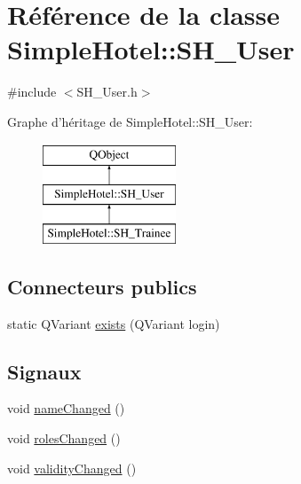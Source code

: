 \hypertarget{classSimpleHotel_1_1SH__User}{\section{Référence de la classe Simple\-Hotel\-:\-:S\-H\-\_\-\-User}
\label{classSimpleHotel_1_1SH__User}
}


{\ttfamily \#include $<$S\-H\-\_\-\-User.\-h$>$}

Graphe d'héritage de Simple\-Hotel\-:\-:S\-H\-\_\-\-User\-:\begin{figure}[H]
\begin{center}
\leavevmode
\includegraphics[height=3.000000cm]{classSimpleHotel_1_1SH__User}
\end{center}
\end{figure}
\subsection*{Connecteurs publics}
\begin{DoxyCompactItemize}
\item 
static Q\-Variant \hyperlink{classSimpleHotel_1_1SH__User_a5b620469cfd767611c8be0cea77842ee}{exists} (Q\-Variant login)
\end{DoxyCompactItemize}
\subsection*{Signaux}
\begin{DoxyCompactItemize}
\item 
void \hyperlink{classSimpleHotel_1_1SH__User_af3b558a0626d2fe726f73b65c27299ce}{name\-Changed} ()
\item 
void \hyperlink{classSimpleHotel_1_1SH__User_a3b8e95cc9b6e660e2b879658f923265a}{roles\-Changed} ()
\item 
void \hyperlink{classSimpleHotel_1_1SH__User_a5355f39889901f52c975292df91728cf}{validity\-Changed} ()
\end{DoxyCompactItemize}
